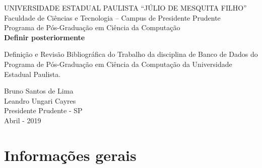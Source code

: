 \documentclass[a4paper,12pt,onecolumn,titlepage]{article}
\begin{document}


\begin{titlepage} %
	\vfill
	\begin{center}	
		{\large \uppercase{Universidade Estadual Paulista ``Júlio de Mesquita Filho''}} \\[0.5cm]
		{\large Faculdade de Ciências e Tecnologia -- Campus de Presidente Prudente} \\[0.5cm]					
		{\large Programa de Pós-Graduação em Ciência da Computação} \\[5cm]
		{\Large \textbf{Definir posteriormente}}\\[6cm]
	\hspace{.45\textwidth}
	\begin{minipage}{.5\textwidth}
		\small Definição e Revisão Bibliográfica do Trabalho da disciplina de Banco de Dados do Programa de Pós-Graduação em Ciência da Computação da Universidade Estadual Paulista.\\[0.5cm]
	\end{minipage}
	\vfill
	\vspace{2.5cm}
	\small Bruno Santos de Lima\\
	\small Leandro Ungari Cayres\\[1cm]
	\small Presidente Prudente - SP\\
	\small Abril - 2019	
	\end{center}	
\end{titlepage}


\onehalfspacing %

\setcounter{page}{2}


\setcounter{page}{3}

\section{Informações gerais}
\label{sec:informacoes-gerais}
\end{document}
